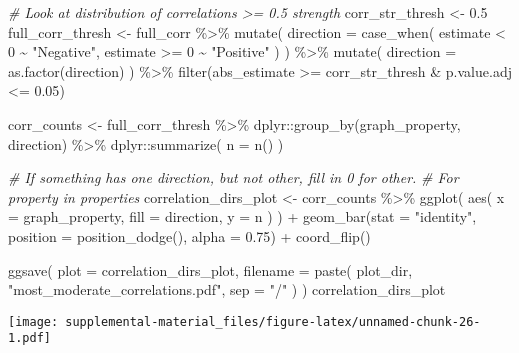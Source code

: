 \documentclass[
]{book}
\newenvironment{Shaded}{\begin{snugshade}}{\end{snugshade}}
\newcommand{\AttributeTok}[1]{\textcolor[rgb]{0.77,0.63,0.00}{#1}}
\newcommand{\CommentTok}[1]{\textcolor[rgb]{0.56,0.35,0.01}{\textit{#1}}}
\newcommand{\DecValTok}[1]{\textcolor[rgb]{0.00,0.00,0.81}{#1}}
\newcommand{\FloatTok}[1]{\textcolor[rgb]{0.00,0.00,0.81}{#1}}
\newcommand{\FunctionTok}[1]{\textcolor[rgb]{0.00,0.00,0.00}{#1}}
\newcommand{\NormalTok}[1]{#1}
\newcommand{\OtherTok}[1]{\textcolor[rgb]{0.56,0.35,0.01}{#1}}
\newcommand{\SpecialCharTok}[1]{\textcolor[rgb]{0.00,0.00,0.00}{#1}}
\newcommand{\StringTok}[1]{\textcolor[rgb]{0.31,0.60,0.02}{#1}}
\begin{document}
\begin{Shaded}
\begin{Highlighting}[]
\CommentTok{\# Look at distribution of correlations \textgreater{}= 0.5 strength}
\NormalTok{corr\_str\_thresh }\OtherTok{\textless{}{-}} \FloatTok{0.5}
\NormalTok{full\_corr\_thresh }\OtherTok{\textless{}{-}}\NormalTok{ full\_corr }\SpecialCharTok{\%\textgreater{}\%}
  \FunctionTok{mutate}\NormalTok{(}
    \AttributeTok{direction =} \FunctionTok{case\_when}\NormalTok{(}
\NormalTok{      estimate }\SpecialCharTok{\textless{}} \DecValTok{0} \SpecialCharTok{\textasciitilde{}} \StringTok{"Negative"}\NormalTok{,}
\NormalTok{      estimate }\SpecialCharTok{\textgreater{}=} \DecValTok{0} \SpecialCharTok{\textasciitilde{}} \StringTok{"Positive"}
\NormalTok{    )}
\NormalTok{  ) }\SpecialCharTok{\%\textgreater{}\%}
  \FunctionTok{mutate}\NormalTok{(}
    \AttributeTok{direction =} \FunctionTok{as.factor}\NormalTok{(direction)}
\NormalTok{  ) }\SpecialCharTok{\%\textgreater{}\%}
  \FunctionTok{filter}\NormalTok{(abs\_estimate }\SpecialCharTok{\textgreater{}=}\NormalTok{ corr\_str\_thresh }\SpecialCharTok{\&}\NormalTok{ p.value.adj }\SpecialCharTok{\textless{}=} \FloatTok{0.05}\NormalTok{)}

\NormalTok{corr\_counts }\OtherTok{\textless{}{-}}\NormalTok{ full\_corr\_thresh }\SpecialCharTok{\%\textgreater{}\%}
\NormalTok{  dplyr}\SpecialCharTok{::}\FunctionTok{group\_by}\NormalTok{(graph\_property, direction) }\SpecialCharTok{\%\textgreater{}\%}
\NormalTok{  dplyr}\SpecialCharTok{::}\FunctionTok{summarize}\NormalTok{(}
    \AttributeTok{n =} \FunctionTok{n}\NormalTok{()}
\NormalTok{  )}

\CommentTok{\# If something has one direction, but not other, fill in 0 for other.}
\CommentTok{\# For property in properties}
\NormalTok{correlation\_dirs\_plot }\OtherTok{\textless{}{-}}\NormalTok{ corr\_counts }\SpecialCharTok{\%\textgreater{}\%}
  \FunctionTok{ggplot}\NormalTok{(}
    \FunctionTok{aes}\NormalTok{(}
      \AttributeTok{x =}\NormalTok{ graph\_property,}
      \AttributeTok{fill =}\NormalTok{ direction,}
      \AttributeTok{y =}\NormalTok{ n}
\NormalTok{    )}
\NormalTok{  ) }\SpecialCharTok{+}
  \FunctionTok{geom\_bar}\NormalTok{(}\AttributeTok{stat =} \StringTok{"identity"}\NormalTok{, }\AttributeTok{position =} \FunctionTok{position\_dodge}\NormalTok{(), }\AttributeTok{alpha =} \FloatTok{0.75}\NormalTok{) }\SpecialCharTok{+}
  \FunctionTok{coord\_flip}\NormalTok{()}

\FunctionTok{ggsave}\NormalTok{(}
  \AttributeTok{plot =}\NormalTok{ correlation\_dirs\_plot,}
  \AttributeTok{filename =} \FunctionTok{paste}\NormalTok{(}
\NormalTok{    plot\_dir,}
    \StringTok{"most\_moderate\_correlations.pdf"}\NormalTok{,}
    \AttributeTok{sep =} \StringTok{"/"}
\NormalTok{  )}
\NormalTok{)}
\NormalTok{correlation\_dirs\_plot}
\end{Highlighting}
\end{Shaded}

\texttt{[image: supplemental-material\_files/figure-latex/unnamed-chunk-26-1.pdf]}

  
\end{document}
